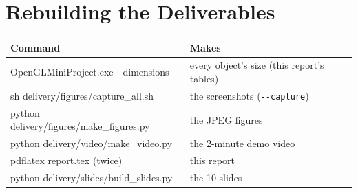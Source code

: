 \documentclass[11pt,a4paper]{article}
\newcommand{\code}[1]{\texttt{\small #1}}
\begin{document}
\section{Rebuilding the Deliverables}
\begin{tabularx}{\textwidth}{@{}>{\ttfamily\small}l X@{}}
\toprule
\normalfont\bfseries Command & \bfseries Makes \\ \midrule
OpenGLMiniProject.exe -{}-dimensions & every object's size (this report's tables) \\
sh delivery/figures/capture\_all.sh & the screenshots (\code{-{}-capture}) \\
python delivery/figures/make\_figures.py & the JPEG figures \\
python delivery/video/make\_video.py & the 2-minute demo video \\
pdflatex report.tex (twice) & this report \\
python delivery/slides/build\_slides.py & the 10 slides \\
\bottomrule
\end{tabularx}
\end{document}
